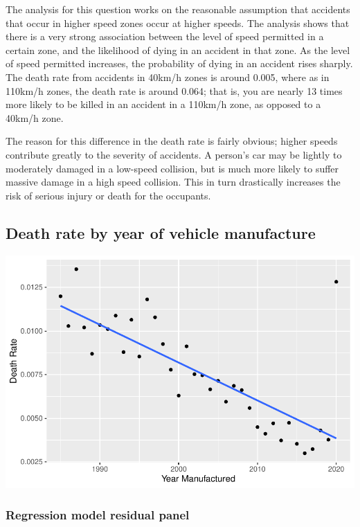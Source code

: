 \documentclass[11pt,a4paper,]{article}
\begin{document}
The analysis for this question works on the reasonable assumption that accidents that occur in higher speed zones occur at higher speeds. The analysis shows that there is a very strong association between the level of speed permitted in a certain zone, and the likelihood of dying in an accident in that zone. As the level of speed permitted increases, the probability of dying in an accident rises sharply. The death rate from accidents in 40km/h zones is around 0.005, where as in 110km/h zones, the death rate is around 0.064; that is, you are nearly 13 times more likely to be killed in an accident in a 110km/h zone, as opposed to a 40km/h zone.

The reason for this difference in the death rate is fairly obvious; higher speeds contribute greatly to the severity of accidents. A person's car may be lightly to moderately damaged in a low-speed collision, but is much more likely to suffer massive damage in a high speed collision. This in turn drastically increases the risk of serious injury or death for the occupants.

\subsection*{Death rate by year of vehicle manufacture}

\includegraphics{Report_files/figure-latex/plot-death-rate-by-year-manuf-1.pdf}

\subsubsection*{Regression model residual panel}
\end{document}
